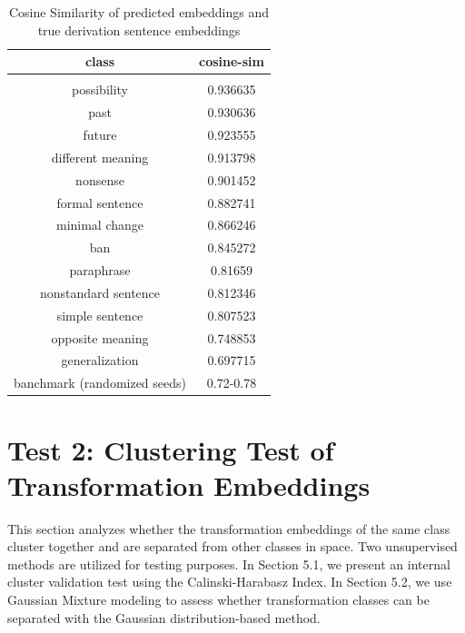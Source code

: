 \documentclass[11pt]{article}
\begin{document}
\begin{table}[!htp]
\centering
\begin{tabular}{ c c }
\toprule
\vspace{0.1cm}
\textbf{class}&\textbf{cosine-sim} \vspace{0.15cm}\\ 
 \hline \\[-1.7ex]
\vspace{0.1cm} possibility &    0.936635 \\
\vspace{0.1cm} past & 0.930636 \\
\vspace{0.1cm} future &     0.923555 \\
\vspace{0.1cm} different meaning &    0.913798 \\
\vspace{0.1cm} nonsense &   0.901452 \\
\vspace{0.1cm} formal sentence &0.882741 \\
\vspace{0.1cm} minimal change & 0.866246 \\
\vspace{0.1cm} ban &  0.845272 \\
\vspace{0.1cm} paraphrase & 0.81659  \\
\vspace{0.1cm} nonstandard sentence & 0.812346 \\
\vspace{0.1cm} simple sentence &0.807523 \\
\vspace{0.1cm} opposite meaning &     0.748853 \\
\vspace{0.1cm} generalization & 0.697715 \\ 
\vspace{0.1cm} banchmark (randomized seeds) & 0.72-0.78 \\

\toprule
\end{tabular}
\caption{Cosine Similarity of predicted embeddings and true derivation sentence embeddings}
\label{cosine}
\end{table}

\section{Test 2: Clustering Test of Transformation Embeddings}\label{sec:cluster}
This section analyzes whether the transformation embeddings of the same class cluster together and are separated from other classes in space. Two unsupervised methods are utilized for testing purposes. In Section 5.1, we present an internal cluster validation test using the Calinski-Harabasz Index. In Section 5.2, we use Gaussian Mixture modeling to assess whether transformation classes can be separated with the Gaussian distribution-based method.
\end{document}
